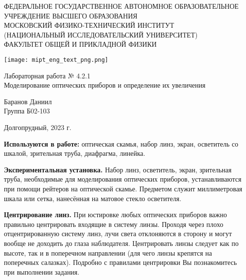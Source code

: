 \documentclass[a4paper,12pt]{article} %
\begin{document}
\begin{center}
	\footnotesize{ФЕДЕРАЛЬНОЕ ГОСУДАРСТВЕННОЕ АВТОНОМНОЕ ОБРАЗОВАТЕЛЬНОЕ 			УЧРЕЖДЕНИЕ ВЫСШЕГО ОБРАЗОВАНИЯ}\\
	\footnotesize{МОСКОВСКИЙ ФИЗИКО-ТЕХНИЧЕСКИЙ ИНСТИТУТ\\(НАЦИОНАЛЬНЫЙ 			ИССЛЕДОВАТЕЛЬСКИЙ УНИВЕРСИТЕТ)}\\
	\footnotesize{ФАКУЛЬТЕТ ОБЩЕЙ И ПРИКЛАДНОЙ ФИЗИКИ\\}
	\hfill \break
	\hfill \break
	\hfill \break
	\hfill \break
\end{center}


\begin{figure*}[h]
    \centering
    \texttt{[image: mipt\_eng\_text\_png.png]}
    \label{fig:my_label}
\end{figure*}


\begin{center}   
    \hfill \break
	\hfill \break
	\hfill \break
	\large{Лабораторная работа № 4.2.1\\ \hfill \break\Large{Моделирование оптических приборов и определение их увеличения}}\\
	\hfill \break
	\hfill \break
	\hfill \break
	\begin{flushright}
		Баранов Даниил\\
		Группа Б02-103
	\end{flushright}
	\hfill \break
	\hfill \break
	\hfill \break
\end{center}
\hfill \break
\hfill \break
\hfill \break
\hfill \break
\begin{center}
	Долгопрудный, 2023 г.
\end{center}
\thispagestyle{empty}

\newpage

\textbf{Используются в работе:}  оптическая скамья, набор линз, экран, осветитель со шкалой, зрительная труба, диафрагма, линейка.

\textbf{Экспериментальная установка.} Набор линз, осветитель, экран, зрительная труба, необходимые для моделирования оптических приборов, устанавливаются при помощи рейтеров на оптической скамье. Предметом служит миллиметровая шкала или сетка, нанесённая на матовое стекло осветителя.

\textbf{Центрирование линз.} При юстировке любых оптических приборов важно правильно центрировать входящие в систему линзы. Проходя через плохо отцентрированную систему линз, лучи света отклоняются в сторону и могут вообще не доходить до глаза наблюдателя. Центрировать линзы следует как по высоте, так и в поперечном направлении (для чего линзы крепятся на поперечных салазках). Подробно с правилами центрировки Вы познакомитесь при выполнении задания.
\end{document}
